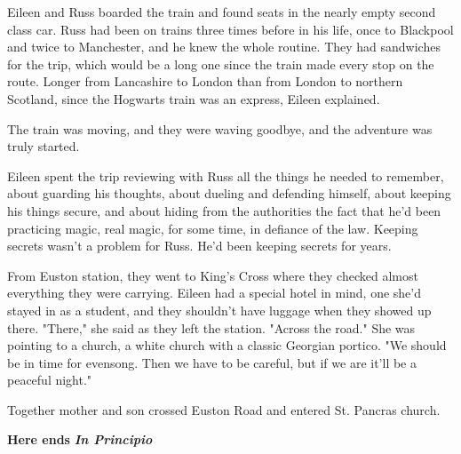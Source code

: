 \documentclass[a4paper,11pt]{article}
\begin{document}
Eileen and Russ boarded the train and found seats in the nearly empty second class car. Russ had been on trains three times before in his life, once to Blackpool and twice to Manchester, and he knew the whole routine. They had sandwiches for the trip, which would be a long one since the train made every stop on the route. Longer from Lancashire to London than from London to northern Scotland, since the Hogwarts train was an express, Eileen explained.

The train was moving, and they were waving goodbye, and the adventure was truly started.

Eileen spent the trip reviewing with Russ all the things he needed to remember, about guarding his thoughts, about dueling and defending himself, about keeping his things secure, and about hiding from the authorities the fact that he'd been practicing magic, real magic, for some time, in defiance of the law. Keeping secrets wasn't a problem for Russ. He'd been keeping secrets for years.

From Euston station, they went to King's Cross where they checked almost everything they were carrying. Eileen had a special hotel in mind, one she'd stayed in as a student, and they shouldn't have luggage when they showed up there. "There," she said as they left the station. "Across the road." She was pointing to a church, a white church with a classic Georgian portico. "We should be in time for evensong. Then we have to be careful, but if we are it'll be a peaceful night."

Together mother and son crossed Euston Road and entered St. Pancras church.

\textbf{Here ends }\emph{\textbf{In Principio}}
\end{document}
